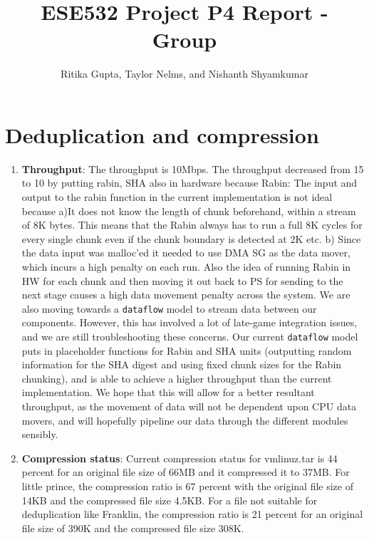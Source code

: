 \documentclass{article}
\title{ESE532 Project P4 Report - Group}
\author{Ritika Gupta, Taylor Nelms, and Nishanth Shyamkumar}
\begin{document}
\maketitle


\section{Deduplication and compression}
\begin{enumerate}
\item%
\textbf{Throughput}: The throughput is 10Mbps. The throughput decreased from 15 to 10 by putting rabin, SHA also in hardware because 
Rabin: The input and output to the rabin function in the current implementation is not ideal because 
a)It does not know the length of chunk beforehand, within a stream of 8K bytes. This means that the Rabin always has to run a full 8K cycles for every single chunk even if the chunk boundary is detected at 2K etc.
b) Since the data input was malloc'ed it needed to use DMA SG as the data mover, which incurs a high penalty on each run. Also the idea of running Rabin in HW for each chunk and then moving it out back to PS for sending to the next stage causes a high data movement penalty across the system. 
\newline\newline
We are also moving towards a \texttt{dataflow} model to stream data between our components. However, this has involved a lot of late-game integration issues, and we are still troubleshooting these concerns. 
Our current \texttt{dataflow} model puts in placeholder functions for Rabin and SHA units (outputting random information for the SHA digest and using fixed chunk sizes for the Rabin chunking), and is able to achieve a higher throughput than the current implementation. 
We hope that this will allow for a better resultant throughput, as the movement of data will not be dependent upon CPU data movers, and will hopefully pipeline our data through the different modules sensibly.
\newline

\item%
\textbf{Compression status}: Current compression status for vmlinuz.tar is 44 percent for an original file size of 66MB and it compressed it to 37MB. For little prince, the compression ratio is 67 percent with the original file size of 14KB and the compressed file size 4.5KB. For a file not suitable for deduplication like Franklin, the compression ratio is 21 percent for an original file size of 390K and the compressed file size 308K.
\newline


\end{enumerate}
\end{document}
